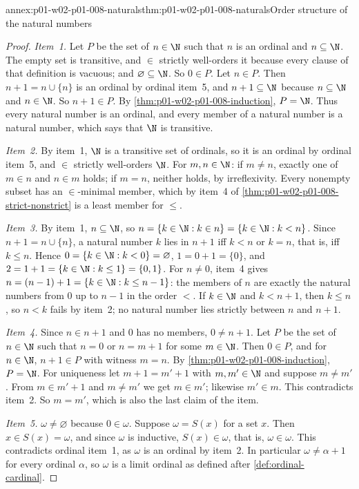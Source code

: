 \begin{annexitem}{annex:p01-w02-p01-008-naturals}{thm:p01-w02-p01-008-naturals}{Order structure of the natural numbers}
\begin{proof}
\emph{Item~1.} Let \(P\) be the set of \(n\in\N\) such that \(n\) is an
ordinal and \(n\subseteq\N\). The empty set is transitive, and \(\in\)
strictly well-orders it because every clause of that definition is
vacuous; and \(\varnothing\subseteq\N\). So \(0\in P\). Let \(n\in P\). Then
\(n+1=n\cup\{n\}\) is an ordinal by ordinal item~5, and
\(n+1\subseteq\N\) because \(n\subseteq\N\) and \(n\in\N\). So \(n+1\in P\).
By \cref{thm:p01-w02-p01-008-induction}, \(P=\N\). Thus every natural
number is an ordinal, and every member of a natural number is a natural
number, which says that \(\N\) is transitive.

\emph{Item~2.} By item~1, \(\N\) is a transitive set of ordinals, so it is
an ordinal by ordinal item~5, and \(\in\) strictly well-orders \(\N\). For
\(m,n\in\N\): if \(m\neq n\), exactly one of \(m\in n\) and \(n\in m\)
holds; if \(m=n\), neither holds, by irreflexivity. Every nonempty subset
has an \(\in\)-minimal member, which by item~4 of
\cref{thm:p01-w02-p01-008-strict-nonstrict} is a least member for
\(\leq\).

\emph{Item~3.} By item~1, \(n\subseteq\N\), so
\(n=\{k\in\N:k\in n\}=\{k\in\N:k<n\}\). Since \(n+1=n\cup\{n\}\), a natural
number \(k\) lies in \(n+1\) iff \(k<n\) or \(k=n\), that is, iff
\(k\leq n\). Hence \(0=\{k\in\N:k<0\}=\varnothing\), \(1=0+1=\{0\}\), and
\(2=1+1=\{k\in\N:k\leq1\}=\{0,1\}\). For \(n\neq0\), item~4 gives
\(n=(n-1)+1=\{k\in\N:k\leq n-1\}\): the members of \(n\) are exactly the
natural numbers from \(0\) up to \(n-1\) in the order \(<\). If \(k\in\N\)
and \(k<n+1\), then \(k\leq n\), so \(n<k\) fails by item~2; no natural
number lies strictly between \(n\) and \(n+1\).

\emph{Item~4.} Since \(n\in n+1\) and \(0\) has no members, \(0\neq n+1\).
Let \(P\) be the set of \(n\in\N\) such that \(n=0\) or \(n=m+1\) for some
\(m\in\N\). Then \(0\in P\), and for \(n\in\N\), \(n+1\in P\) with
witness \(m=n\). By \cref{thm:p01-w02-p01-008-induction}, \(P=\N\). For
uniqueness let \(m+1=m'+1\) with \(m,m'\in\N\) and suppose \(m\neq m'\).
From \(m\in m'+1\) and \(m\neq m'\) we get \(m\in m'\); likewise
\(m'\in m\). This contradicts item~2. So \(m=m'\), which is also the last
claim of the item.

\emph{Item~5.} \(\omega\neq\varnothing\) because \(0\in\omega\). Suppose
\(\omega=S(x)\) for a set \(x\). Then \(x\in S(x)=\omega\), and since
\(\omega\) is inductive, \(S(x)\in\omega\), that is, \(\omega\in\omega\).
This contradicts ordinal item~1, as \(\omega\) is an ordinal by item~2. In
particular \(\omega\neq\alpha+1\) for every ordinal \(\alpha\), so \(\omega\)
is a limit ordinal as defined after \cref{def:ordinal-cardinal}.
\end{proof}
\end{annexitem}

